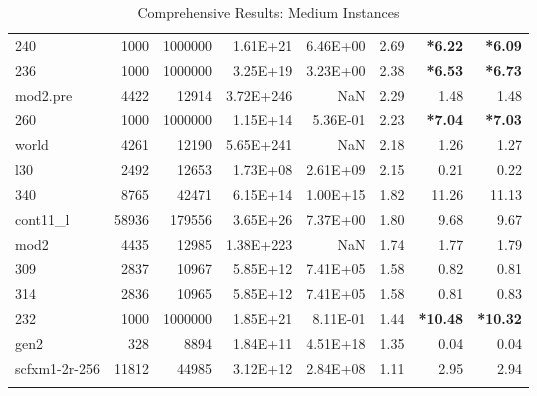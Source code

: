 \documentclass[10pt]{article}
\newcommand{\red}{
	\color{red}	
	}
\begin{document}
\begin{longtable}{|l|r|r|r|r|r|r|r|}
240	&	1000	&	1000000	&	1.61E+21	&	6.46E+00	&	2.69	&	{\bf \red *6.22}	&	{\bf \red *6.09}	\\
236	&	1000	&	1000000	&	3.25E+19	&	3.23E+00	&	2.38	&	{\bf \red *6.53}	&	{\bf \red *6.73}	\\
mod2.pre	&	4422	&	12914	&	3.72E+246	&	NaN	&	2.29	&	1.48	&	1.48	\\
260	&	1000	&	1000000	&	1.15E+14	&	5.36E-01	&	2.23	&	{\bf \red *7.04}	&	{\bf \red *7.03} 	\\
world	&	4261	&	12190	&	5.65E+241	&	NaN	&	2.18	&	1.26	&	1.27	\\
l30	&	2492	&	12653	&	1.73E+08	&	2.61E+09	&	2.15	&	0.21	&	0.22	\\
340	&	8765	&	42471	&	6.15E+14	&	1.00E+15	&	1.82	&	11.26	&	11.13	\\
cont11\_l	&	58936	&	179556	&	3.65E+26	&	7.37E+00	&	1.80	&	9.68	&	9.67	\\
mod2	&	4435	&	12985	&	1.38E+223	&	NaN	&	1.74	&	1.77	&	1.79	\\
309	&	2837	&	10967	&	5.85E+12	&	7.41E+05	&	1.58	&	0.82	&	0.81	\\
314	&	2836	&	10965	&	5.85E+12	&	7.41E+05	&	1.58	&	0.81	&	0.83	\\
232	&	1000	&	1000000	&	1.85E+21	&	8.11E-01	&	1.44	&	{\bf \red *10.48} 	&	{\bf \red *10.32} 	\\
gen2	&	328	&	8894	&	1.84E+11	&	4.51E+18	&	1.35	&	0.04	&	0.04	\\
scfxm1-2r-256	&	11812	&	44985	&	3.12E+12	&	2.84E+08	&	1.11	&	2.95	&	2.94	\\
\hline
\caption{Comprehensive Results: Medium Instances}
\small
\centering
\label{supptab:all_medium}
\end{longtable}
\end{document}

